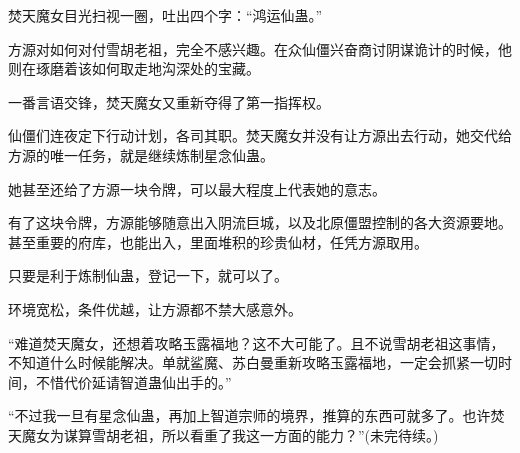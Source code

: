 \begin{this_body}
焚天魔女目光扫视一圈，吐出四个字：“鸿运仙蛊。”

方源对如何对付雪胡老祖，完全不感兴趣。在众仙僵兴奋商讨阴谋诡计的时候，他则在琢磨着该如何取走地沟深处的宝藏。

一番言语交锋，焚天魔女又重新夺得了第一指挥权。

仙僵们连夜定下行动计划，各司其职。焚天魔女并没有让方源出去行动，她交代给方源的唯一任务，就是继续炼制星念仙蛊。

她甚至还给了方源一块令牌，可以最大程度上代表她的意志。

有了这块令牌，方源能够随意出入阴流巨城，以及北原僵盟控制的各大资源要地。甚至重要的府库，也能出入，里面堆积的珍贵仙材，任凭方源取用。

只要是利于炼制仙蛊，登记一下，就可以了。

环境宽松，条件优越，让方源都不禁大感意外。

“难道焚天魔女，还想着攻略玉露福地？这不大可能了。且不说雪胡老祖这事情，不知道什么时候能解决。单就鲨魔、苏白曼重新攻略玉露福地，一定会抓紧一切时间，不惜代价延请智道蛊仙出手的。”

“不过我一旦有星念仙蛊，再加上智道宗师的境界，推算的东西可就多了。也许焚天魔女为谋算雪胡老祖，所以看重了我这一方面的能力？”(未完待续。)

\end{this_body}

